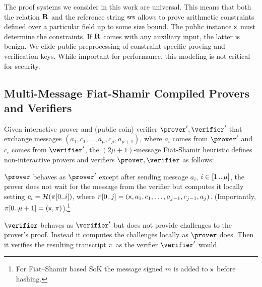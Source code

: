  The proof systems we consider in this work are universal. This means that both the relation $\mathbf{R}$ and the reference string $\mathsf{srs}$ allows to prove arithmetic constraints defined over a particular field up to some size bound. The public instance $\mathsf{x}$ must determine the constraints. 
If $\mathbf{R}$ comes with any auxiliary input, the latter is benign. 
We elide public preprocessing of constraint specific proving and verification keys. While important for performance, this modeling is not critical for security.


\subsection{Multi-Message Fiat-Shamir Compiled Provers and Verifiers}
Given interactive prover and (public coin) verifier $\prover', \verifier'$ that exchange messages $(a_1, c_1, \ldots, a_{\mu}, c_{\mu}, a_{\mu + 1})$, where $a_i$ comes from
$\prover'$ and $c_i$ comes from $\verifier'$, the $(2\mu + 1)$-message Fiat-Shamir heuristic defines non-interactive provers and verifiers $\prover, \verifier$ as follows:

\begin{compactitem}
	\item $\prover$ behaves as $\prover'$ except after sending message
	  $a_i$, $i \in [1 \, .. \, \mu]$, the prover does not wait for
	  the message from the verifier but computes it locally setting $c_i
	  = \mathcal{H}(\pi[0..i])$, where $\pi[0..j] = (\mathsf{x}, a_1, c_1, \ldots,
	  a_{j - 1}, c_{j - 1}, a_j)$. (Importantly, $\pi[0..\mu + 1] =
	  (\mathsf{x}, \pi)$).\footnote{For Fiat--Shamir based SoK the message signed $m$ is added to $\mathsf{x}$ before hashing.}
	\item $\verifier$ behaves as $\verifier'$ but does not provide
	  challenges to the prover's proof. Instead it computes the
	  challenges locally as $\prover$ does. Then it verifies the
	  resulting transcript $\pi$ as the verifier $\verifier'$ would. 
	\end{compactitem}

